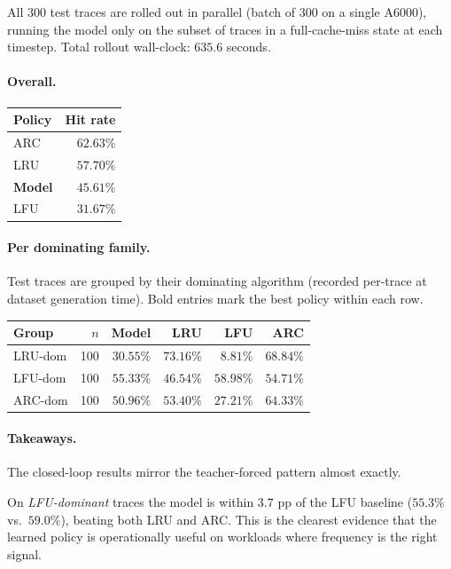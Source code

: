 \documentclass{article}
\begin{document}
All 300 test traces are rolled out in parallel (batch of 300 on a single
A6000), running the model only on the subset of traces in a full-cache-miss
state at each timestep. Total rollout wall-clock: $635.6$ seconds.

\paragraph{Overall.}
\begin{center}
\begin{tabular}{lr}
\toprule
Policy & Hit rate \\
\midrule
ARC   & $62.63\%$ \\
LRU   & $57.70\%$ \\
\textbf{Model} & $\mathbf{45.61\%}$ \\
LFU   & $31.67\%$ \\
\bottomrule
\end{tabular}
\end{center}

\paragraph{Per dominating family.} Test traces are grouped by their
dominating algorithm (recorded per-trace at dataset generation time). Bold
entries mark the best policy within each row.

\begin{center}
\begin{tabular}{lrrrrr}
\toprule
Group & $n$ & Model & LRU & LFU & ARC \\
\midrule
LRU-dom & 100 & $30.55\%$ & $\mathbf{73.16\%}$ & $\phantom{0}8.81\%$ & $68.84\%$ \\
LFU-dom & 100 & $55.33\%$ & $46.54\%$ & $\mathbf{58.98\%}$ & $54.71\%$ \\
ARC-dom & 100 & $50.96\%$ & $53.40\%$ & $27.21\%$ & $\mathbf{64.33\%}$ \\
\bottomrule
\end{tabular}
\end{center}

\paragraph{Takeaways.} The closed-loop results mirror the teacher-forced
pattern almost exactly.

On \emph{LFU-dominant} traces the model is within $3.7$ pp of the LFU
baseline ($55.3\%$ vs.\ $59.0\%$), beating both LRU and ARC. This is the
clearest evidence that the learned policy is operationally useful on
workloads where frequency is the right signal.
\end{document}
